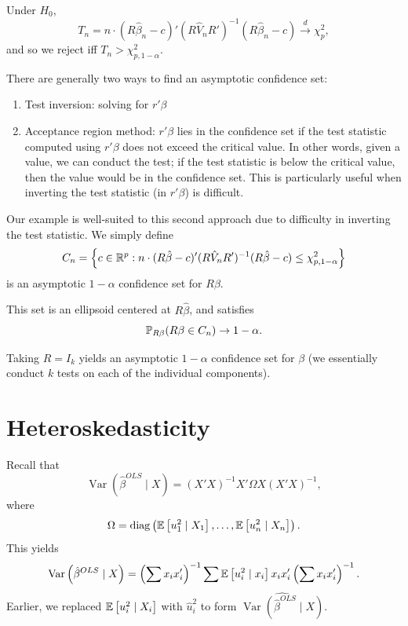 \begin{proposition}
	Under $H_0$, \[
		T_n = n \cdot (R\hat{\beta}_n - c)' (R\hat{V}_n R')^{-1} (R\hat{\beta}_n - c) \xrightarrow{d} \chi^2_p
	,\] and so we reject iff $T_n > \chi^2_{p,1-\alpha}$.
\end{proposition}

\begin{proposition}
		There are generally two ways to find an asymptotic confidence set:
		\begin{enumerate}[label=(\roman*)]
			\item Test inversion: solving for $r' \beta$
			\item Acceptance region method: $r' \beta$ lies in the confidence set if the test statistic computed using $r' \beta$ does not exceed the critical value. In other words, given a value, we can conduct the test; if the test statistic is below the critical value, then the value would be in the confidence set.
				This is particularly useful when inverting the test statistic (in $r'\beta$) is difficult.
		\end{enumerate}

	Our example is well-suited to this second approach due to difficulty in inverting the test statistic.
	We simply define \[
		C_n = \left\{ c \in \R^p : n \cdot (R\hat{\beta} - c)' (R\hat{V}_n R')^{-1} (R\hat{\beta} - c) \le \chi^2_{p,1-\alpha} \right\}
	\] is an asymptotic $1 - \alpha$ confidence set for $R\beta$.
	
	This set is an ellipsoid centered at $R\hat{\beta}$, and satisfies \[
		\P_{R\beta}(R\beta \in C_n) \to 1 - \alpha
	.\] 
	
		Taking $R = I_k$ yields an asymptotic $1 - \alpha$ confidence set for $\beta$ (we essentially conduct $k$ tests on each of the individual components).
	\end{proposition}

\section{Heteroskedasticity}

Recall that \[
	\operatorname{Var}\left(\hat{\beta}^{OLS} \mid X\right) = \left( X'X \right)^{-1}X' \Omega X \left( X'X \right)^{-1}
,\] where \[
	\Omega = \operatorname{diag}\left( \E\left[u_1^2 \mid X_1\right] ,\ldots,\E\left[u_n^2 \mid X_n\right]  \right)
.\] This yields \[
	\operatorname{Var}\left(\hat{\beta}^{OLS} \mid X\right) = \left( \sum x_i x_i' \right)^{-1} \sum \E\left[u_i ^2 \mid x_i\right] x_i x_i ' \left( \sum x_i x_i' \right)^{-1}
.\] 
Earlier, we replaced $\E\left[u_i^2 \mid X_i\right] $ with $\hat{u}_i^2$ to form $\widehat{\operatorname{Var}(\hat{\beta}^{OLS}\mid X)}$.

